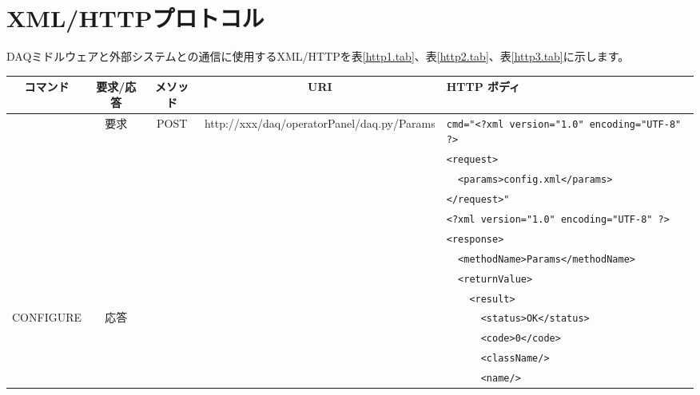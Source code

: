 \documentclass[a4j,10pt,dvips,onecolumn,oneside,final]{jarticle}%
\begin{document}
\section{XML/HTTPプロトコル}\label{xmlhttp}
DAQミドルウェアと外部システムとの通信に使用するXML/HTTPを表\ref{http1.tab}、表\ref{http2.tab}、表\ref{http3.tab}に示します。
\begin{table}[htbp]
\begin{center}
{\scriptsize
    \begin{tabular}{|c|c|c|c|l|}\hline
      コマンド    & 要求/応答 & メソッド & URI                      & HTTP ボディ\\ \hline
                  & 要求      & POST & http://xxx/daq/operatorPanel/daq.py/Params & \verb|cmd="<?xml version="1.0" encoding="UTF-8" ?>|\\
                  &           &      &                                            & \verb|<request>|\\ 
                  &           &      &                                            & \verb|  <params>config.xml</params>|\\
                  &           &      &                                            & \verb|</request>"|\\ \cline{2-5}
                  &           &      &                                            & \verb|<?xml version="1.0" encoding="UTF-8" ?>|\\ 
                  &           &      &                                            & \verb|<response>|\\ 
                  &           &      &                                            & \verb|  <methodName>Params</methodName>|\\ 
                  &           &      &                                            & \verb|  <returnValue>|\\ 
                  &           &      &                                            & \verb|    <result>|\\ 
 {\tiny CONFIGURE} & 応答     &      &                                            & \verb|      <status>OK</status>|\\ 
                  &           &      &                                            & \verb|      <code>0</code>|\\ 
                  &           &      &                                            & \verb|      <className/>|\\ 
                  &           &      &                                            & \verb|      <name/>|\\ 

\end{tabular}}
\end{center}
\end{table}
\end{document}
